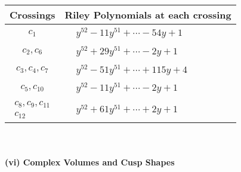 \documentclass[1p]{elsarticle_modified}
\theoremstyle{definition}
\begin{document}
\begin{tabular}{m{50pt}|m{274pt}}
Crossings & \hspace{64pt}Riley Polynomials at each crossing \\
\hline $$\begin{aligned}c_{1}\end{aligned}$$&$\begin{aligned}
&y^{52}-11 y^{51}+\cdots-54 y+1
\end{aligned}$\\
\hline $$\begin{aligned}c_{2},c_{6}\end{aligned}$$&$\begin{aligned}
&y^{52}+29 y^{51}+\cdots-2 y+1
\end{aligned}$\\
\hline $$\begin{aligned}c_{3},c_{4},c_{7}\end{aligned}$$&$\begin{aligned}
&y^{52}-51 y^{51}+\cdots+115 y+4
\end{aligned}$\\
\hline $$\begin{aligned}c_{5},c_{10}\end{aligned}$$&$\begin{aligned}
&y^{52}-11 y^{51}+\cdots-2 y+1
\end{aligned}$\\
\hline $$\begin{aligned}c_{8},c_{9},c_{11}\\c_{12}\end{aligned}$$&$\begin{aligned}
&y^{52}+61 y^{51}+\cdots+2 y+1
\end{aligned}$\\
\hline
\end{tabular}\\~\\
\newpage\flushleft \textbf{(vi) Complex Volumes and Cusp Shapes}
\end{document}
